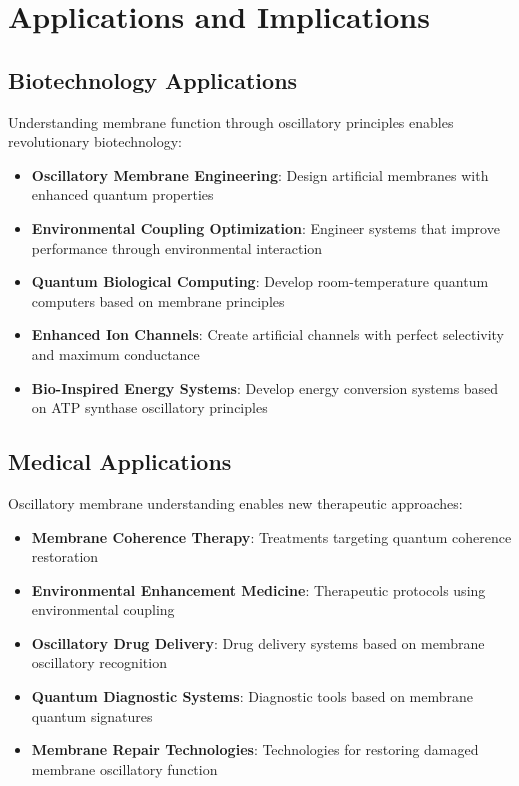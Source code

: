 \documentclass[12pt,a4paper]{article}
\begin{document}
\section{Applications and Implications}

\subsection{Biotechnology Applications}

Understanding membrane function through oscillatory principles enables revolutionary biotechnology:

\begin{itemize}
\item \textbf{Oscillatory Membrane Engineering}: Design artificial membranes with enhanced quantum properties
\item \textbf{Environmental Coupling Optimization}: Engineer systems that improve performance through environmental interaction
\item \textbf{Quantum Biological Computing}: Develop room-temperature quantum computers based on membrane principles
\item \textbf{Enhanced Ion Channels}: Create artificial channels with perfect selectivity and maximum conductance
\item \textbf{Bio-Inspired Energy Systems}: Develop energy conversion systems based on ATP synthase oscillatory principles
\end{itemize}

\subsection{Medical Applications}

Oscillatory membrane understanding enables new therapeutic approaches:

\begin{itemize}
\item \textbf{Membrane Coherence Therapy}: Treatments targeting quantum coherence restoration
\item \textbf{Environmental Enhancement Medicine}: Therapeutic protocols using environmental coupling
\item \textbf{Oscillatory Drug Delivery}: Drug delivery systems based on membrane oscillatory recognition
\item \textbf{Quantum Diagnostic Systems}: Diagnostic tools based on membrane quantum signatures
\item \textbf{Membrane Repair Technologies}: Technologies for restoring damaged membrane oscillatory function
\end{itemize}
\end{document}
